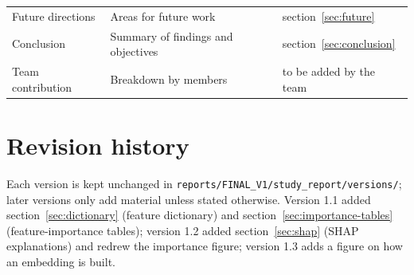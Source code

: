 \documentclass[11pt,a4paper]{article}
\begin{document}
\begin{center}
\begin{longtable}{>{\raggedright\arraybackslash}p{3.91cm}>{\raggedright\arraybackslash}p{8.40cm}>{\raggedright\arraybackslash}p{2.93cm}}
\hspace{0pt}Future directions & \hspace{0pt}Areas for future work & \hspace{0pt}section~\ref{sec:future}\\
\hspace{0pt}Conclusion & \hspace{0pt}Summary of findings and objectives & \hspace{0pt}section~\ref{sec:conclusion}\\
\hspace{0pt}Team contribution & \hspace{0pt}Breakdown by members & \hspace{0pt}to be added by the team\\
\end{longtable}\end{center}
\section*{Revision history}
Each version is kept unchanged in \texttt{reports/FINAL\_\allowbreak{}V1/study\_\allowbreak{}report/versions/}; later versions only add material unless stated otherwise. Version 1.1 added section~\ref{sec:dictionary} (feature dictionary) and section~\ref{sec:importance-tables} (feature-importance tables); version 1.2 added section~\ref{sec:shap} (SHAP explanations) and redrew the importance figure; version 1.3 adds a figure on how an embedding is built.
\end{document}
